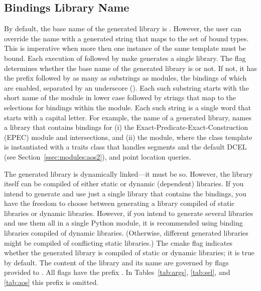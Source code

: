 \subsection{Bindings Library Name}
\label{sec:gen:libraryName}
By default, the base name of the generated library is . However, the user can override the name with a generated string that maps to the set of bound types. This is imperative when more then one instance of the same template must be bound. Each execution of  followed by make generates a single library. The \cmake{} flag  determines whether the base name of the generated library is  or not. If not, it has the prefix  followed by as many as substrings as modules, the bindings of which are enabled, separated by an underscore (\myLstinline{_}). Each such substring starts with the short name of the module in lower case followed by strings that map to the selections for bindings within the module. Each such string is a single word that starts with a capital letter. For example, the name  of a generated library, names a library that contains bindings for (i) the Exact-Predicate-Exact-Construction (EPEC) \iiDandiiiDGeometryKernelPackage{} module and intersections, and (ii) the \iiDArrangementsPackage{} module, where the  class template is instantiated with a traits class that handles segments and the default DCEL (see Section~\ref{ssec:modules:aos2}), and point location queries.

The generated library is dynamically linked---it must be so. However, the library itself can be compiled of either static or dynamic (dependent) libraries. If you intend to generate and use just a single library that contains the bindings, you have the freedom to choose between generating a library compiled of static libraries or dynamic libraries. However, if you intend to generate several libraries and use them all in a single Python module, it is recommended using binding libraries compiled of dynamic libraries. (Otherwise, different generated libraries might be compiled of conflicting static libraries.) The cmake flag  indicates whether the generated library is compiled of static or dynamic libraries; it is true by default.
%
The content of the library and its name are governed by flags provided to . All flags have the prefix . In Tables~\ref{tab:args}, \ref{tab:sel}, and \ref{tab:aos} this prefix is omitted.

